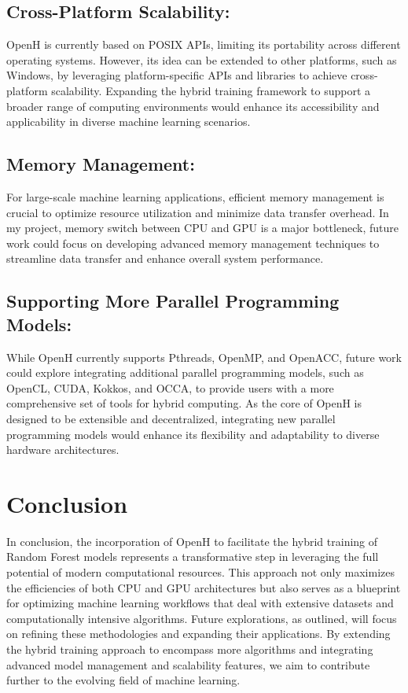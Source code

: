 \documentclass[13pt]{article}
\begin{document}
\subsection{Cross-Platform Scalability:}
OpenH is currently based on POSIX APIs, limiting its portability across different operating systems.
However, its idea can be extended to other platforms, such as Windows, by leveraging platform-specific APIs and libraries to achieve cross-platform scalability.
Expanding the hybrid training framework to support a broader range of computing environments would enhance its accessibility and applicability in diverse machine learning scenarios.

\subsection{Memory Management:}
For large-scale machine learning applications, efficient memory management is crucial to optimize resource utilization and minimize data transfer overhead.
In my project, memory switch between CPU and GPU is a major bottleneck, future work could focus on developing advanced memory management techniques to streamline data transfer and enhance overall system performance.

\subsection{Supporting More Parallel Programming Models:}
While OpenH currently supports Pthreads, OpenMP, and OpenACC, future work could explore integrating additional parallel programming models, such as OpenCL, CUDA, Kokkos, and OCCA, to provide users with a more comprehensive set of tools for hybrid computing.
As the core of OpenH is designed to be extensible and decentralized, integrating new parallel programming models would enhance its flexibility and adaptability to diverse hardware architectures.

\newpage
\section{Conclusion}
In conclusion, the incorporation of OpenH to facilitate the hybrid training of Random Forest models represents a transformative step in leveraging the full potential of modern computational resources.
This approach not only maximizes the efficiencies of both CPU and GPU architectures but also serves as a blueprint for optimizing machine learning workflows that deal with extensive datasets and computationally intensive algorithms.
Future explorations, as outlined, will focus on refining these methodologies and expanding their applications. By extending the hybrid training approach to encompass more algorithms and integrating advanced model management and scalability features, we aim to contribute further to the evolving field of machine learning. 
\end{document}

